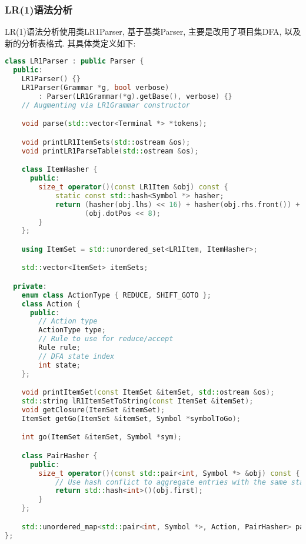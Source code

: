 \subsubsection{LR(1)语法分析}
LR(1)语法分析使用类LR1Parser, 基于基类Parser, 主要是改用了项目集DFA,
以及新的分析表格式. 其具体类定义如下:
\begin{lstlisting}[language=c++]
class LR1Parser : public Parser {
  public:
    LR1Parser() {}
    LR1Parser(Grammar *g, bool verbose)
        : Parser(LR1Grammar(*g).getBase(), verbose) {}
    // Augmenting via LR1Grammar constructor

    void parse(std::vector<Terminal *> *tokens);

    void printLR1ItemSets(std::ostream &os);
    void printLR1ParseTable(std::ostream &os);

    class ItemHasher {
      public:
        size_t operator()(const LR1Item &obj) const {
            static const std::hash<Symbol *> hasher;
            return (hasher(obj.lhs) << 16) + hasher(obj.rhs.front()) +
                   (obj.dotPos << 8);
        }
    };

    using ItemSet = std::unordered_set<LR1Item, ItemHasher>;

    std::vector<ItemSet> itemSets;

  private:
    enum class ActionType { REDUCE, SHIFT_GOTO };
    class Action {
      public:
        // Action type
        ActionType type;
        // Rule to use for reduce/accept
        Rule rule;
        // DFA state index
        int state;
    };

    void printItemSet(const ItemSet &itemSet, std::ostream &os);
    std::string lR1ItemSetToString(const ItemSet &itemSet);
    void getClosure(ItemSet &itemSet);
    ItemSet getGo(ItemSet &itemSet, Symbol *symbolToGo);

    int go(ItemSet &itemSet, Symbol *sym);

    class PairHasher {
      public:
        size_t operator()(const std::pair<int, Symbol *> &obj) const {
            // Use hash conflict to aggregate entries with the same state
            return std::hash<int>()(obj.first);
        }
    };

    std::unordered_map<std::pair<int, Symbol *>, Action, PairHasher> parseTable;
};
\end{lstlisting}

